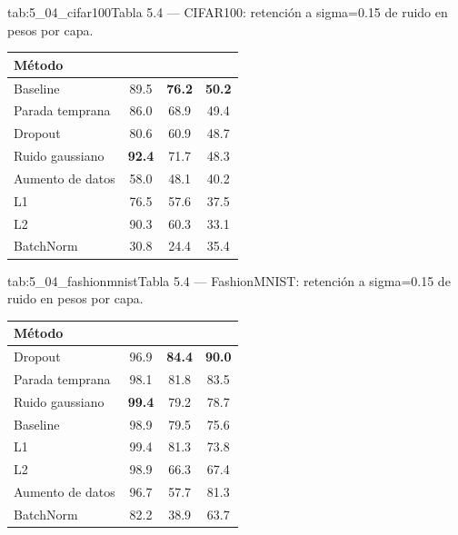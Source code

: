\begin{table}{tab:5_04_cifar100}{Tabla 5.4 — CIFAR100: retención a sigma=0.15 de ruido en pesos por capa.}
\small
\begin{tabular}{lccc}
\toprule
\textbf{Método} & \textbf{Ret. conv1 (\\%
\midrule
Baseline & 89.5 & \textbf{76.2} & \textbf{50.2} \\
Parada temprana & 86.0 & 68.9 & 49.4 \\
Dropout & 80.6 & 60.9 & 48.7 \\
Ruido gaussiano & \textbf{92.4} & 71.7 & 48.3 \\
Aumento de datos & 58.0 & 48.1 & 40.2 \\
L1 & 76.5 & 57.6 & 37.5 \\
L2 & 90.3 & 60.3 & 33.1 \\
BatchNorm & 30.8 & 24.4 & 35.4 \\
\bottomrule
\end{tabular}
\end{table}

\begin{table}{tab:5_04_fashionmnist}{Tabla 5.4 — FashionMNIST: retención a sigma=0.15 de ruido en pesos por capa.}
\small
\begin{tabular}{lccc}
\toprule
\textbf{Método} & \textbf{Ret. conv1 (\\%
\midrule
Dropout & 96.9 & \textbf{84.4} & \textbf{90.0} \\
Parada temprana & 98.1 & 81.8 & 83.5 \\
Ruido gaussiano & \textbf{99.4} & 79.2 & 78.7 \\
Baseline & 98.9 & 79.5 & 75.6 \\
L1 & 99.4 & 81.3 & 73.8 \\
L2 & 98.9 & 66.3 & 67.4 \\
Aumento de datos & 96.7 & 57.7 & 81.3 \\
BatchNorm & 82.2 & 38.9 & 63.7 \\
\bottomrule
\end{tabular}
\end{table}